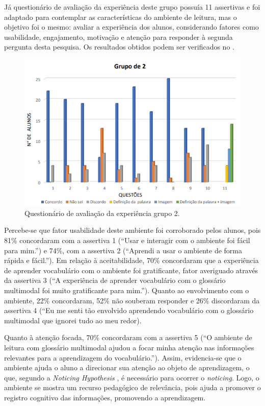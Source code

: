 Já questionário de avaliação da experiência deste grupo possuía 11
assertivas e foi adaptado para contemplar as características do ambiente
de leitura, mas o objetivo foi o mesmo: avaliar a experiência dos
alunos, considerando fatores como usabilidade, engajamento, motivação e
atenção para responder à segunda pergunta desta pesquisa. Os resultados
obtidos podem ser verificados no .

\begin{figure}[htpb]
    \centering
    \begin{minipage}{.75\textwidth}
    \includegraphics[width=\textwidth]{graph-04.png}
    \caption{Questionário de avaliação da experiência grupo 2.}
    \label{graph-04}
    \end{minipage}
\end{figure}

Percebe-se que fator usabilidade deste ambiente foi corroborado pelos
alunos, pois 81\% concordaram com a assertiva 1 (``Usar e interagir com
o ambiente foi fácil para mim.'') e 74\%, com a assertiva 2 (``Aprendi a
usar o ambiente de forma rápida e fácil.''). Em relação à
aceitabilidade, 70\% concordaram que a experiência de aprender
vocabulário com o ambiente foi gratificante, fator averiguado através da
assertiva 3 (``A experiência de aprender vocabulário com o glossário
multimodal foi muito gratificante para mim.''). Quanto ao envolvimento
com o ambiente, 22\% concordaram, 52\% não souberam responder e 26\%
discordaram da assertiva 4 (``Eu me senti tão envolvido aprendendo
vocabulário com o glossário multimodal que ignorei tudo ao meu redor).

Quanto à atenção focada, 70\% concordaram com a assertiva 5 (``O
ambiente de leitura com glossário multimodal ajudou a focar minha
atenção nas informações relevantes para a aprendizagem do
vocabulário.''). Assim, evidencia-se que o ambiente ajuda o aluno a
direcionar sua atenção ao objeto de aprendizagem, o que, segundo a
\emph{Noticing Hypothesis} \cite{schmidit1990}, é necessário para ocorrer o
\emph{noticing}. Logo, o ambiente se mostra um recurso pedagógico de
relevância, pois ajuda a promover o registro cognitivo das informações,
promovendo a aprendizagem.


